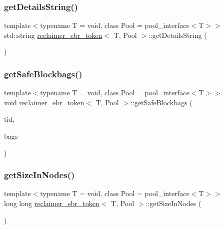 \subsubsection{\texorpdfstring{get\+Details\+String()}{getDetailsString()}}
{\footnotesize\ttfamily template$<$typename T  = void, class Pool  = pool\+\_\+interface$<$\+T$>$$>$ \\
std\+::string \hyperlink{classreclaimer__ebr__token}{reclaimer\+\_\+ebr\+\_\+token}$<$ T, Pool $>$\+::get\+Details\+String (\begin{DoxyParamCaption}{ }\end{DoxyParamCaption})\hspace{0.3cm}{\ttfamily [inline]}}

\mbox{\label{classreclaimer__ebr__token_ae2fee48a5fa6b5e1626a5f5c98eb111b}} 
\subsubsection{\texorpdfstring{get\+Safe\+Blockbags()}{getSafeBlockbags()}}
{\footnotesize\ttfamily template$<$typename T  = void, class Pool  = pool\+\_\+interface$<$\+T$>$$>$ \\
void \hyperlink{classreclaimer__ebr__token}{reclaimer\+\_\+ebr\+\_\+token}$<$ T, Pool $>$\+::get\+Safe\+Blockbags (\begin{DoxyParamCaption}\item[{const int}]{tid,  }\item[{\hyperlink{classblockbag}{blockbag}$<$ T $>$ $\ast$$\ast$}]{bags }\end{DoxyParamCaption})\hspace{0.3cm}{\ttfamily [inline]}}

\mbox{\label{classreclaimer__ebr__token_aea32a21f3af9b3491ae008ef7166fcbc}} 
\subsubsection{\texorpdfstring{get\+Size\+In\+Nodes()}{getSizeInNodes()}}
{\footnotesize\ttfamily template$<$typename T  = void, class Pool  = pool\+\_\+interface$<$\+T$>$$>$ \\
long long \hyperlink{classreclaimer__ebr__token}{reclaimer\+\_\+ebr\+\_\+token}$<$ T, Pool $>$\+::get\+Size\+In\+Nodes (\begin{DoxyParamCaption}{ }\end{DoxyParamCaption})\hspace{0.3cm}{\ttfamily [inline]}}

